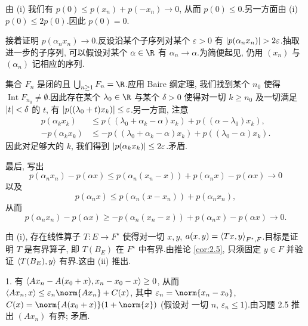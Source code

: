 
由 (i) 我们有 $p(0)\le p(x_n)+p(-x_n)\to0$, 从而 $p(0)\le0$.另一方面由 (i)
$p(0)\le2p(0)$.因此 $p(0)=0$.

接着证明 $p(\alpha_nx_n)\to0$.反设沿某个子序列对某个 $\varepsilon>0$
有 $\abs{p(\alpha_nx_n)}>2\varepsilon$.抽取进一步的子序列, 可以假设对某个
$\alpha\in\R$ 有 $\alpha_n\to\alpha$.为简便起见, 仍用 $(x_n)$ 与 $(\alpha_n)$
记相应的序列.

集合 $F_n$ 是闭的且 $\bigcup_{n\ge1}F_n=\R$.应用 Baire 纲定理, 我们找到某个
$n_0$ 使得 $\operatorname{Int}F_{n_0}\ne\emptyset$.因此存在某个 $\lambda_0\in\R$
与某个 $\delta>0$ 使得对一切 $k\ge n_0$ 及一切满足 $\left|t\right|<\delta$ 的 $t$,
有 $\left|p((\lambda_0+t)x_k)\right|\le\varepsilon$.另一方面, 注意
\begin{align*}
p(\alpha_kx_k)&\le p((\lambda_0+\alpha_k-\alpha)x_k)+p((\alpha-\lambda_0)x_k),\\
-p(\alpha_kx_k)&\le-p((\lambda_0+\alpha_k-\alpha)x_k)+p((\lambda_0-\alpha)x_k).
\end{align*}
因此对足够大的 $k$, 我们得到 $\left|p(\alpha_kx_k)\right|\le2\varepsilon$.矛盾.

最后, 写出
\begin{equation*}
p(\alpha_nx_n)-p(\alpha x)\le p(\alpha_n(x_n-x))+p(\alpha_nx)-p(\alpha x)\to0
\end{equation*}
以及
\begin{equation*}
p(\alpha_nx)\le p(\alpha_n(x-x_n))+p(\alpha_nx_n),
\end{equation*}
从而
\begin{equation*}
p(\alpha_nx_n)-p(\alpha x)\ge-p(\alpha_n(x_n-x))+p(\alpha_nx)-p(\alpha x)\to0.
\end{equation*}


由 (i), 存在线性算子 $T:E\to F^\star$ 使得对一切 $x,y$,
$a(x,y)=\left\langle Tx,y\right\rangle_{F^\star,F}$.目标是证明 $T$ 是有界算子, 即 $T(B_E)$
在 $F^\star$ 中有界.由推论  \ref{cor:2.5}, 只须固定 $y\in F$ 并验证
$\left\langle T(B_E),y\right\rangle$ 有界.这由 (ii) 推出.


1. 有 $\left\langle Ax_n-A(x_0+x),x_n-x_0-x\right\rangle\ge0$, 从而
$\dual{Ax_n}{x}\le\varepsilon_n\norm{Ax_n}+C(x)$, 其中
$\varepsilon_n=\norm{x_n-x_0}$, $C(x)=\norm{A(x_0+x)}(1+\norm{x})$ (假设对
一切 $n$, $\varepsilon_n\le1$).由习题 2.5 推出 $(Ax_n)$ 有界; 矛盾.

